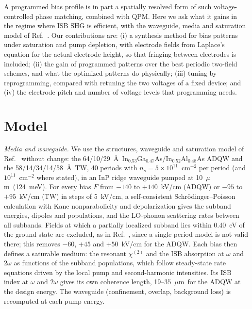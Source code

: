\documentclass[11pt]{article}
\newcommand{\chitwo}{\chi^{(2)}}
\newcommand{\um}{~$\mu$m}
\begin{document}
A programmed bias profile is in part a spatially resolved form of such voltage-controlled phase matching, combined with QPM. Here we ask what it gains in the regime where ISB SHG is efficient, with the waveguide, media and saturation model of Ref.~\cite{OwnbyN1}. Our contributions are: (i) a synthesis method for bias patterns under saturation and pump depletion, with electrode fields from Laplace's equation for the actual electrode height, so that fringing between electrodes is included; (ii) the gain of programmed patterns over the best periodic two-field schemes, and what the optimized patterns do physically; (iii) tuning by reprogramming, compared with retuning the two voltages of a fixed device; and (iv) the electrode pitch and number of voltage levels that programming needs.

\section{Model}\label{sec:model}
\emph{Media and waveguide.} We use the structures, waveguide and saturation model of Ref.~\cite{OwnbyN1} without change: the 64/10/29~\AA\ In$_{0.53}$Ga$_{0.47}$As/In$_{0.52}$Al$_{0.48}$As ADQW and the 58/14/34/14/58~\AA\ TW, 40 periods with $n_s=5\times10^{11}$~cm$^{-2}$ per period (and $10^{11}$~cm$^{-2}$ where stated), in an InP ridge waveguide pumped at 10\um\ (124~meV). For every bias $F$ from $-140$ to $+140$~kV/cm (ADQW) or $-95$ to $+95$~kV/cm (TW) in steps of 5~kV/cm, a self-consistent Schr\"odinger--Poisson calculation with Kane nonparabolicity and depolarization gives the subband energies, dipoles \cite{OwnbyMETH01} and populations, and the LO-phonon scattering rates between all subbands. Fields at which a partially localized subband lies within 0.40~eV of the ground state are excluded, as in Ref.~\cite{OwnbyN1}, since a single-period model is not valid there; this removes $-60$, $+45$ and $+50$~kV/cm for the ADQW. Each bias then defines a saturable medium: the resonant $\chitwo$ and the ISB absorption at $\omega$ and $2\omega$ as functions of the subband populations, which follow steady-state rate equations driven by the local pump and second-harmonic intensities. Its ISB index at $\omega$ and $2\omega$ gives its own coherence length, 19--35\um\ for the ADQW at the design energy. The waveguide (confinement, overlap, background loss) is recomputed at each pump energy.
\end{document}

